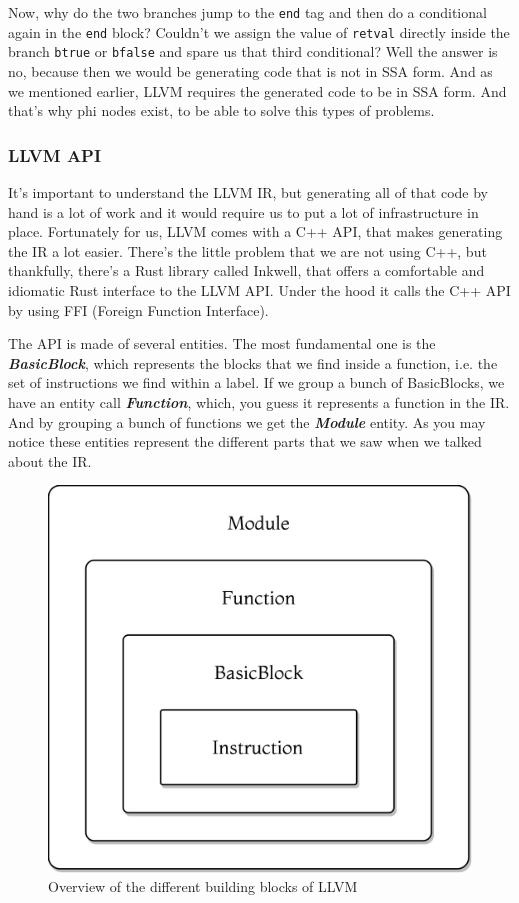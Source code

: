 ﻿\documentclass[10pt,a4paper,twocolumn,twoside]{article}
\begin{document}
Now, why do the two branches jump to the \texttt{end} tag and then do a
conditional again in the \texttt{end} block? Couldn't we assign the value of
\texttt{retval} directly inside the branch \texttt{btrue} or \texttt{bfalse} and
spare us that third conditional? Well the answer is no, because then we would be
generating code that is not in SSA form. And as we mentioned earlier, LLVM
requires the generated code to be in SSA form. And that's why phi nodes exist,
to be able to solve this types of problems.

\subsubsection{LLVM API}

It's important to understand the LLVM IR, but generating all of that code by 
hand is a lot of work and it would require us to put a lot of infrastructure in
place. Fortunately for us, LLVM comes with a C++ API, that makes generating the
IR a lot easier. There's the little problem that we are not using C++, but 
thankfully, there's a Rust library called Inkwell, that offers a comfortable and 
idiomatic Rust interface to the LLVM API. Under the hood it calls the C++ API
by using FFI (Foreign Function Interface).

The API is made of several entities. The most fundamental one is the
\textbf{\textit{BasicBlock}}, which represents the blocks that we find inside a
function, i.e. the set of instructions we find within a label. If we group a
bunch of BasicBlocks, we have an entity call \textbf{\textit{Function}}, which,
you guess it represents a function in the IR. And by grouping a bunch of
functions we get the \textbf{\textit{Module}} entity. As you may notice these
entities represent the different parts that we saw when we talked about the IR.

\begin{figure}[ht]
\centering
\captionsetup{justification=centering,margin=1cm}
\includegraphics[width=0.75\linewidth]{llvm-blocks}
\caption{Overview of the different building blocks of LLVM}
\end{figure}
\end{document}
